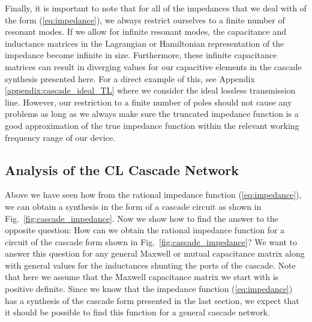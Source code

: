 Finally, it is important to note that for all of the impedances that we deal with of the form (\ref{eq:impedance}), we always restrict ourselves to a finite number of resonant modes. If we allow for infinite resonant modes, the capacitance  and inductance matrices in the Lagrangian or Hamiltonian representation of the impedance become infinite in size. Furthermore, these infinite capacitance matrices can result in diverging values for our capacitive elements in the cascade synthesis presented here. For a direct example of this, see Appendix \ref{appendix:cascade_ideal_TL} where we consider the ideal lossless transmission line. However, our restriction to a finite number of poles should not cause any problems as long as we always make sure the truncated impedance function is a good approximation of the true impedance function within the relevant working frequency range of our device. 

\subsection{Analysis of the CL Cascade Network}\label{section:cascade_analysis}
Above we have seen how from the rational impedance function (\ref{eq:impedance}), we can obtain a synthesis in the form of a cascade circuit as shown in Fig.\ \ref{fig:cascade_impedance}. Now we show how to find the answer to the opposite question: How can we obtain the rational impedance function for a circuit of the cascade form shown in Fig.\ \ref{fig:cascade_impedance}? We want to answer this question for any general Maxwell or mutual capacitance matrix along with general values for the inductances shunting the ports of the cascade. Note that here we assume that the Maxwell capacitance matrix we start with is positive definite. Since we know that the impedance function (\ref{eq:impedance}) has a synthesis of the cascade form presented in the last section, we expect that it should be possible to find this function for a general cascade network.

